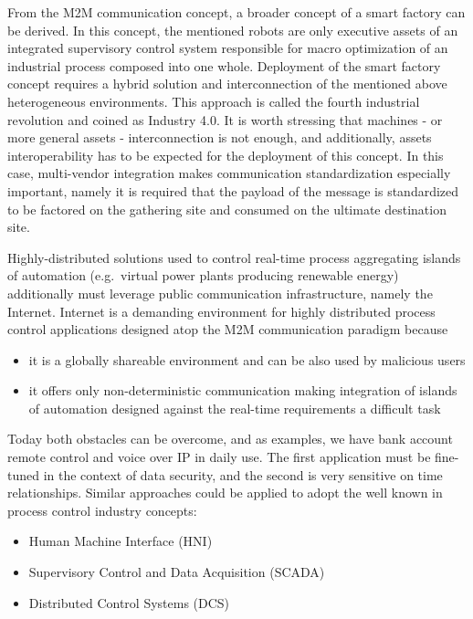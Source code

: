 \documentclass{jacsart}
\providecommand{\tightlist} { \setlength{\itemsep}{0pt}\setlength{\parskip}{0pt}}
\begin{document}
From the M2M communication concept, a broader concept of a smart factory
can be derived. In this concept, the mentioned robots are only executive
assets of an integrated supervisory control system responsible for macro
optimization of an industrial process composed into one whole.
Deployment of the smart factory concept requires a hybrid solution and
interconnection of the mentioned above heterogeneous environments. This
approach is called the fourth industrial revolution and coined as
Industry 4.0. It is worth stressing that machines - or more general
assets - interconnection is not enough, and additionally, assets
interoperability has to be expected for the deployment of this concept.
In this case, multi-vendor integration makes communication
standardization especially important, namely it is required that the
payload of the message is standardized to be factored on the gathering
site and consumed on the ultimate destination site.

Highly-distributed solutions used to control real-time process
aggregating islands of automation (e.g.~virtual power plants producing
renewable energy) additionally must leverage public communication
infrastructure, namely the Internet. Internet is a demanding environment
for highly distributed process control applications designed atop the
M2M communication paradigm because

\begin{itemize}
\tightlist
\item
  it is a globally shareable environment and can be also used by
  malicious users
\item
  it offers only non-deterministic communication making integration of
  islands of automation designed against the real-time requirements a
  difficult task
\end{itemize}

Today both obstacles can be overcome, and as examples, we have bank
account remote control and voice over IP in daily use. The first
application must be fine-tuned in the context of data security, and the
second is very sensitive on time relationships. Similar approaches could
be applied to adopt the well known in process control industry concepts:

\begin{itemize}
\tightlist
\item
  Human Machine Interface (HNI)
\item
  Supervisory Control and Data Acquisition (SCADA)
\item
  Distributed Control Systems (DCS)
\end{itemize}
\end{document}
